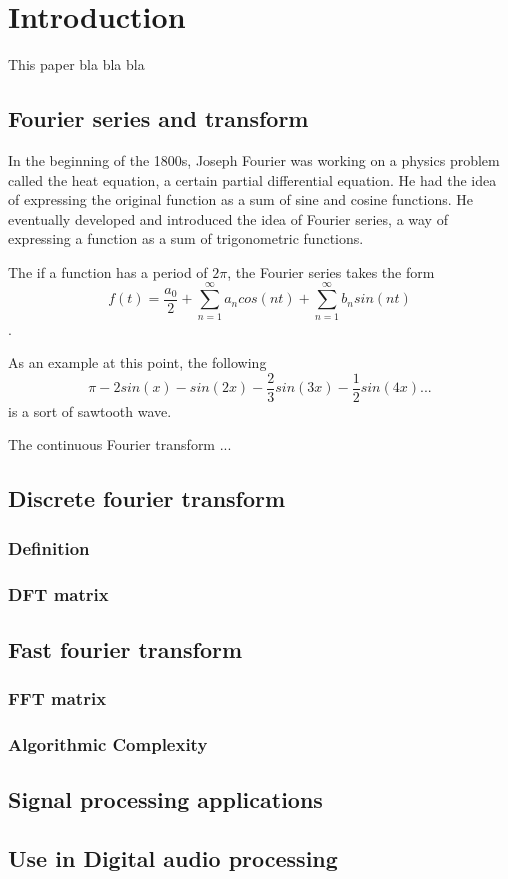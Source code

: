 \section{Introduction}
This paper bla bla bla

\subsection{Fourier series and transform}
In the beginning of the 1800s, Joseph Fourier was working on a physics problem called the heat equation, a certain partial differential equation. He had the idea of expressing the original function as a sum of sine and cosine functions. He eventually developed and introduced the idea of Fourier series, a way of expressing a function as a sum of trigonometric functions. 

The if a function has a period of $2\pi$, the Fourier series takes the form $$f(t) = \frac{a_0}{2} + \sum_{n=1}^{\infty}a_ncos(nt)+\sum_{n=1}^{\infty}b_nsin(nt)$$.

As an example at this point, the following $$\pi -2sin(x) -sin(2x) -\frac{2}{3}sin(3x) -\frac{1}{2}sin(4x) ... $$ is a sort of sawtooth wave.

The continuous Fourier transform ...
\subsection{Discrete fourier transform}
\subsubsection{Definition}
\subsubsection{DFT matrix}

\subsection{Fast fourier transform}
\subsubsection{FFT matrix}
\subsubsection{Algorithmic Complexity}

\subsection{Signal processing applications}

\subsection{Use in Digital audio processing}

